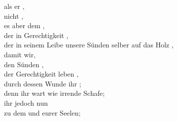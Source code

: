                     als er , \\
                    nicht , \\
                    es aber dem , \\
                    der in Gerechtigkeit , \\
                    der in seinem Leibe unsere Sünden selber auf das Holz , \\
                damit wir, \\
                    den Sünden , \\
                    der Gerechtigkeit leben , \\
                    durch dessen Wunde ihr ; \\
                denn ihr wart wie irrende Schafe; \\
                    ihr  jedoch nun  \\
                    zu dem  und  eurer Seelen; \\
